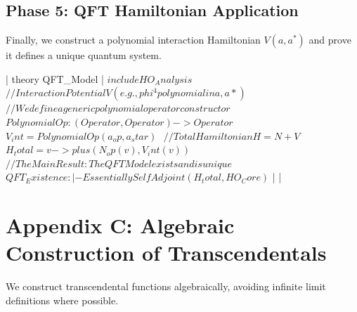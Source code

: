 \documentclass{stex}
\begin{document}
\subsection{Phase 5: QFT Hamiltonian Application}

Finally, we construct a polynomial interaction Hamiltonian $V(a, a^*)$ and prove it defines a unique quantum system.

\uplinline| theory QFT_Model {| 
\uplinline$    include HO_Analysis$
\uplinline$    $
\uplinline$    // Interaction Potential V (e.g., phi^4 polynomial in a, a*)$
\uplinline$    // We define a generic polynomial operator constructor$
\uplinline$    PolynomialOp : (Operator, Operator) -> Operator$
\uplinline$    $
\uplinline$    V_int = PolynomialOp(a_op, a_star)$
\uplinline$    $
\uplinline$    // Total Hamiltonian H = N + V$
\uplinline$    H_total = v -> plus(N_op(v), V_int(v))$
\uplinline$    $
\uplinline$    // The Main Result: The QFT Model exists and is unique$
\uplinline$    QFT_Existence : |- EssentiallySelfAdjoint(H_total, HO_Core)$
\uplinline|  }| 

\section{Appendix C: Algebraic Construction of Transcendentals}

We construct transcendental functions algebraically, avoiding infinite limit definitions where possible.
\end{document}

